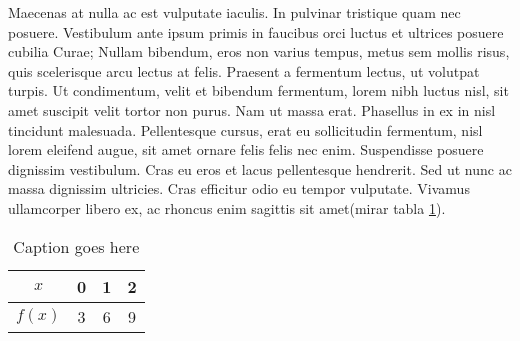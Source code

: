 \documentclass[11pt]{article}
\begin{document}
Maecenas at nulla ac est vulputate iaculis. In pulvinar tristique quam nec posuere. Vestibulum ante ipsum primis in faucibus orci luctus et ultrices posuere cubilia Curae; Nullam bibendum, eros non varius tempus, metus sem mollis risus, quis scelerisque arcu lectus at felis. Praesent a fermentum lectus, ut volutpat turpis. Ut condimentum, velit et bibendum fermentum, lorem nibh luctus nisl, sit amet suscipit velit tortor non purus. Nam ut massa erat. Phasellus in ex in nisl tincidunt malesuada. Pellentesque cursus, erat eu sollicitudin fermentum, nisl lorem eleifend augue, sit amet ornare felis felis nec enim. Suspendisse posuere dignissim vestibulum. Cras eu eros et lacus pellentesque hendrerit. Sed ut nunc ac massa dignissim ultricies. Cras efficitur odio eu tempor vulputate. Vivamus ullamcorper libero ex, ac rhoncus enim sagittis sit amet(mirar tabla \ref{tab:data1}).

\begin{table}[H]
	\centering
		\begin{tabular}{|c|c|c|c|}\hline
		$x$ &0&1&2\\ \hline
		$f(x)$ &3&6&9\\ \hline		
		\end{tabular}
	\caption{Caption goes here}
	\label{tab:data1}
\end{table}



\clearpage

\nocite{*}

\end{document}
